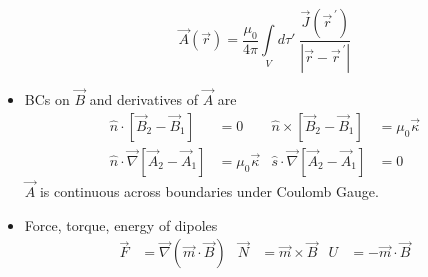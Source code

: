 \documentclass[10pt]{report}
\newcommand{\pvec}[1]{\vec{#1}^{\,\prime}}
\newcommand{\abs}[1]{\left|#1\right|}
\begin{document}
\begin{itemize}
        $$\vec{A}(\vec{r}) = \frac{\mu_0}{4\pi}\int\limits_{V}d\tau'\;\frac{\vec{J}(\pvec{r})}{\abs{\vec{r} - \pvec{r}}}$$
    \item BCs on $\vec{B}$ and derivatives of $\vec{A}$ are
        \begin{align}
            \hat{n} \cdot\left[ \vec{B}_2 - \vec{B}_1 \right] &= 0 &\hat{n}\times\left[\vec{B}_2 - \vec{B}_1\right] &= \mu_0\vec{\kappa}\\
            \hat{n}\cdot\vec{\nabla}\left[ \vec{A}_2 - \vec{A}_1\right] &= \mu_0 \vec{\kappa} & \hat{s}\cdot \vec{\nabla}\left[ \vec{A}_2 - \vec{A}_1 \right] &= 0
        \end{align}
        $\vec{A}$ is continuous across boundaries under Coulomb Gauge.
    \item Force, torque, energy of dipoles
        \begin{align}
            \vec{F} &= \vec{\nabla}(\vec{m}\cdot \vec{B})&
            \vec{N} &= \vec{m}\times \vec{B}&
            U &= -\vec{m}\cdot \vec{B}
        \end{align}
    

\end{itemize}
\end{document}
